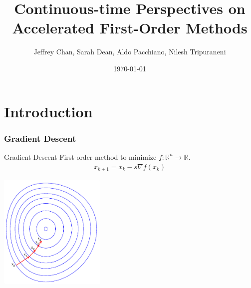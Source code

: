 \documentclass{beamer}
\title[]{Continuous-time Perspectives on Accelerated First-Order Methods} %
\author[Chan, Dean, Pacchiano, Tripuraneni]{Jeffrey Chan, Sarah Dean, Aldo Pacchiano, Nilesh Tripuraneni} %
\institute[UCB] %
{Department of EECS,
University of California, Berkeley }
\date{\today} %
\begin{document}
\begin{frame}
\titlepage %
\end{frame}





\section{Introduction}

\begin{frame}
\frametitle{ Gradient Descent }
\begin{block}{Gradient Descent}
First-order method to minimize $f:\mathbb{R}^n \rightarrow \mathbb{R}$.
\begin{align*}
    x_{k+1} = x_k - s \nabla f(x_k)
\end{align*}
\end{block}

\begin{center}
\includegraphics[width=2in]{SourceFiles/plots/Gradient_descent.eps}
\end{center}
\end{frame}
\end{document}
